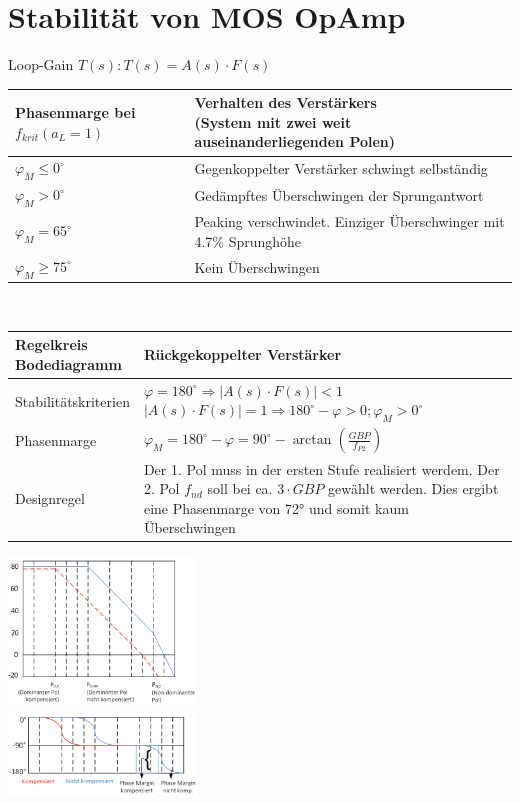 \section{Stabilität von MOS OpAmp}
\begin{minipage}{0.78\linewidth}
Loop-Gain $T(s): T(s)=A(s)\cdot F(s)$\\
\begin{tabular}{|l|l|}
\hline
\makecell[l]{\textbf{Phasenmarge} bei\\$f_{krit} (a_L=1)$} & \makecell[l]{\textbf{Verhalten des Verstärkers}\\(System mit zwei weit auseinanderliegenden Polen)}\\
\hline
$\varphi_M\leq 0^\circ$ & Gegenkoppelter Verstärker schwingt selbständig\\
\hline
$\varphi_M >0^\circ$ & Gedämpftes Überschwingen der Sprungantwort\\
\hline
$\varphi_M =65^\circ$ & Peaking verschwindet. Einziger Überschwinger mit 4.7\% Sprunghöhe\\
\hline
$\varphi_M\geq 75^\circ$ & Kein Überschwingen\\
\hline
\end{tabular}\vspace{5pt}\\
\begin{tabular}{|l|l|}
\hline
\makecell[l]{Regelkreis\\Bodediagramm} & Rückgekoppelter Verstärker\\
\hline
Stabilitätskriterien & \makecell[l]{$\varphi = 180^\circ\Longrightarrow |A(s)\cdot F(s)|<1$\\$|A(s)\cdot F(s)| = 1 \Longrightarrow 180^\circ - \varphi >0; \varphi_M>0^\circ$}\\
\hline
Phasenmarge & $\varphi_M = 180^\circ-\varphi = 90^\circ-\arctan(\frac{GBP}{f_{P2}})$\\
\hline
Designregel & \makecell[l]{Der 1. Pol muss in der ersten Stufe realisiert werdem.\\Der 2. Pol $f_{nd}$ soll bei ca. $3\cdot GBP$ gewählt werden.\\Dies ergibt eine Phasenmarge von 72° und somit\\ kaum Überschwingen}\\
\hline
\end{tabular}
\end{minipage}%
\begin{minipage}{0.2\linewidth}
\includegraphics[width=5cm]{Amplitudengang.png} \\ \includegraphics[width=5cm]{Phasenreserve.png}
\end{minipage}
